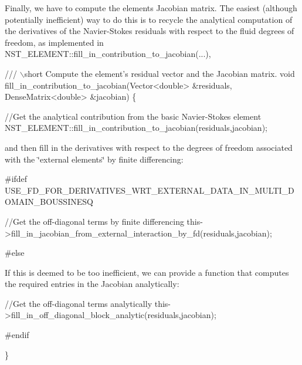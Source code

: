 Finally, we have to compute the element\textquotesingle{}s Jacobian matrix. The easiest (although potentially inefficient) way to do this is to recycle the analytical computation of the derivatives of the Navier-\/\+Stokes residuals with respect to the fluid degrees of freedom, as implemented in {\ttfamily N\+S\+T\+\_\+\+E\+L\+E\+M\+E\+N\+T\+::fill\+\_\+in\+\_\+contribution\+\_\+to\+\_\+jacobian}(...),

 
\begin{DoxyCodeInclude}
 \textcolor{comment}{/// \(\backslash\)short Compute the element's residual vector and the Jacobian matrix.}
  \textcolor{keywordtype}{void} fill\_in\_contribution\_to\_jacobian(Vector<double> &residuals,
                                        DenseMatrix<double> &jacobian)
  \{
   
   \textcolor{comment}{//Get the analytical contribution from the basic Navier-Stokes element}
   NST\_ELEMENT::fill\_in\_contribution\_to\_jacobian(residuals,jacobian);

\end{DoxyCodeInclude}


and then fill in the derivatives with respect to the degrees of freedom associated with the \char`\"{}external
elements\char`\"{} by finite differencing\+:


\begin{DoxyCodeInclude}
   
\textcolor{preprocessor}{#ifdef USE\_FD\_FOR\_DERIVATIVES\_WRT\_EXTERNAL\_DATA\_IN\_MULTI\_DOMAIN\_BOUSSINESQ}

   \textcolor{comment}{//Get the off-diagonal terms by finite differencing}
   this->fill\_in\_jacobian\_from\_external\_interaction\_by\_fd(residuals,jacobian);
   
\textcolor{preprocessor}{#else}

\end{DoxyCodeInclude}


If this is deemed to be too inefficient, we can provide a function that computes the required entries in the Jacobian analytically\+:


\begin{DoxyCodeInclude}
   
   \textcolor{comment}{//Get the off-diagonal terms analytically}
   this->fill\_in\_off\_diagonal\_block\_analytic(residuals,jacobian);
   
\textcolor{preprocessor}{#endif}
   
  \}

\end{DoxyCodeInclude}


